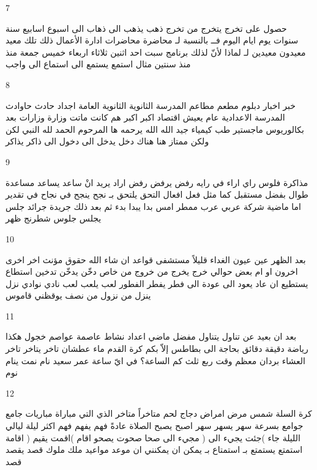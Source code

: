 \documentclass[twocolumn,a4paper]{article}
\newcommand{\prth}[1]{\textenglish{)}#1\textenglish{(}}
\begin{document}
7

\textarabic{ حصول على  
 تخرج  يتخرج من  
 تخرج  
 ذهب  يذهب الى  
 ذهاب الى  
 اسبوع  اسابيع  
 سنة  سنوات  
 يوم  ايام  
 اليوم  
 فــ  
 بالنسبة لـ  
 محاضرة  محاضرات
 ادارة اﻷعمال  
 ذلك  تلك  
 معيد  معيدون
  معيدين
  لـ  
 لماذا  
 ﻷنّ  
 لذلك  
 برنامج  
 سبت  
 احد  
 اثنين  
 ثلاثاء  
 اربعاء  
 خميس  
 جمعة  
 منذ  
 منذ سنتين  
 مثال  
 استمع  يستمع الى  
 استماع الى   
 واجب  
}

8

\textarabic{ خبر  اخبار  
 دبلوم  
 مطعم  مطاعم  
 المدرسة الثانوية  
 الثانوية العامة  
 اجداد  
 حادث  حاوادث  
 المدرسة الاعدادية  
 عام  
 يعيش  
 اقتصاد  
 اكبر  
 اكبر هم  
 كانت  
 ماتت  
 وزارة  وزارات
 بعد  
 بكالوريوس  
 ماجستير  
 طب  
 كيمياء  
 جيد  
 الله  
 الله يرحمه  ها  
 المرحوم  
 الحمد لله  
 النبي  
 لكن  ولكن  
 ممتاز  
 هنا  
 هناك  
 دخل  يدخل الى  
 دخول الى  
 ذاكر  يذاكر  
}

9

\textarabic{ مذاكرة  
 فلوس  
 راي  اراء  
 في رايه  
 رفض  يرفض  
 رفض  
 اراد  يريد انْ  
 ساعد  يساعد  
 مساعدة  
 طوال  
 بفضل  
 مستقبل  
 كما  
 مثل  
 فعل  افعال  
 التحق  يلتحق بـ  
 نجح  ينجح في  
 نجاح في  
 تقدير  
 اما  
 ماضية  
 شركة  
 عربي  عرب  
 ممطر  
 امس  
 بدا  يبدا  
 بدء  
 ثم  
 بعد ذلك  
 جريدة  جرائد  
 جلس  يجلس  
 جلوس  
 شطرنج  
 ظهر  
}

10

\textarabic{ بعد الظهر  
 عين  عيون  
 الغداء  
 قليلاً  
 مستشفى  
 قواعد  
 ان شاء الله  
 حقوق  
 مؤنث  
 اخر  اخرى   
 اخرون  
 او  
 ام  
 بعض  
 حوالي  
 خرج  يخرج من  
 خروج من  
 خاص  
 دخّن  يدخّن  
 تدخين  
 استطاع  يستطيع ان  
 عاد  يعود الى  
 عودة الى  
 فطر  يفطر  
 الفطور  
 لعب  يلعب  
 لعب  
 نادي  نوادي  
 نزل  ينزل من  
 نزول من  
 نصف  
 يوقظني  
 قاموس  
}

11

\textarabic{ بعد ان  
 بعيد عن  
 تناول  يتناول  
 مفضل  
 ماضي  
 اعداد  
 نشاط   
 عاصمة  عواصم  
 خجول  
 هكذا  
 رياضة  
 دقيقة  دقائق  
 بحاجة الى  
 بطاطس  
 إلاّ  
 بكم  
 كرة القدم  
 ماء  
 عطشان  
 تاخر  يتاخر  
 تاخر  
 العشاء  
 بردان  
 معظم  
 وقت  
 ربع  
 ثلث  
 كم الساعة؟  
 في ايّ ساعة  
 عمر  
 سعيد  
 نام  نمت  ينام  
 نوم  
}

12

\textarabic{ كرة السلة  
 شمس  
 مرض  امراض  
 دجاج  
 لحم  
 متاخراً  
 متاخر  
 الذي  التي  
 مباراة  مباريات  
 جامع  جوامع  
 بسرعة  
 سهر  يسهر  
 سهر  
 اصبح  يصبح  
 الصلاة  
 عادةً  
 فهم  يفهم  
 فهم  
 اكثر  
 ليلة  ليالي  
 الليلة  
 جاء \prth{جئت يجيء الى } 
 مجيء الى  
 صحا  صحوت  يصحو  
 اقام \prth{اقمت يقيم } 
 اقامة  
 استمتع  يستمتع بـ  
 استمتاع بـ  
 يمكن ان  
 يمكنني ان  
 موعد  مواعيد  
 ملك  ملوك  
 قصد  يقصد  
 قصد  
}
\end{document}
